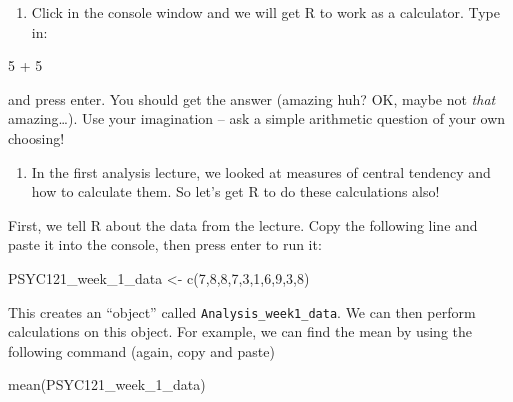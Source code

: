 \documentclass[
]{book}
\newenvironment{Shaded}{\begin{snugshade}}{\end{snugshade}}
\newcommand{\DecValTok}[1]{\textcolor[rgb]{0.00,0.00,0.81}{#1}}
\newcommand{\FunctionTok}[1]{\textcolor[rgb]{0.00,0.00,0.00}{#1}}
\newcommand{\NormalTok}[1]{#1}
\newcommand{\OtherTok}[1]{\textcolor[rgb]{0.56,0.35,0.01}{#1}}
\newcommand{\SpecialCharTok}[1]{\textcolor[rgb]{0.00,0.00,0.00}{#1}}
\providecommand{\tightlist}{%
  \setlength{\itemsep}{0pt}\setlength{\parskip}{0pt}}
\begin{document}
\begin{enumerate}
\def\labelenumi{\arabic{enumi}.}
\tightlist
\item
  Click in the console window and we will get R to work as a calculator. Type in:
\end{enumerate}

\begin{Shaded}
\begin{Highlighting}[]
\DecValTok{5} \SpecialCharTok{+} \DecValTok{5}
\end{Highlighting}
\end{Shaded}

and press enter. You should get the answer (amazing huh? OK, maybe not \emph{that} amazing\ldots). Use your imagination -- ask a simple arithmetic question of your own choosing!

\begin{enumerate}
\def\labelenumi{\arabic{enumi}.}
\setcounter{enumi}{1}
\tightlist
\item
  In the first analysis lecture, we looked at measures of central tendency and how to calculate them. So let's get R to do these calculations also!
\end{enumerate}

First, we tell R about the data from the lecture. Copy the following line and paste it into the console, then press enter to run it:

\begin{Shaded}
\begin{Highlighting}[]
\NormalTok{PSYC121\_week\_1\_data }\OtherTok{\textless{}{-}} \FunctionTok{c}\NormalTok{(}\DecValTok{7}\NormalTok{,}\DecValTok{8}\NormalTok{,}\DecValTok{8}\NormalTok{,}\DecValTok{7}\NormalTok{,}\DecValTok{3}\NormalTok{,}\DecValTok{1}\NormalTok{,}\DecValTok{6}\NormalTok{,}\DecValTok{9}\NormalTok{,}\DecValTok{3}\NormalTok{,}\DecValTok{8}\NormalTok{)}
\end{Highlighting}
\end{Shaded}

This creates an ``object'' called \texttt{Analysis\_week1\_data}. We can then perform calculations on this object. For example, we can find the mean by using the following command (again, copy and paste)

\begin{Shaded}
\begin{Highlighting}[]
\FunctionTok{mean}\NormalTok{(PSYC121\_week\_1\_data)}
\end{Highlighting}
\end{Shaded}
\end{document}
